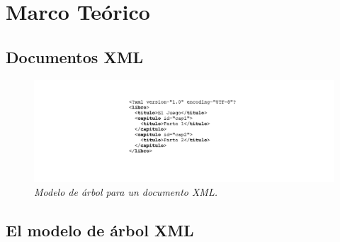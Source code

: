 
\chapter{Marco Te\'orico}
\label{cap:preliminares}


\section{Documentos XML}


\begin{figure}[tp]
  \centering
  \includegraphics[scale=.5]{images/XML-document-example1}
  \caption{\em Modelo de árbol para un documento XML.}
  \label{fig:xml-tree-exa1}
\end{figure}

\section{El modelo de \'arbol XML}
